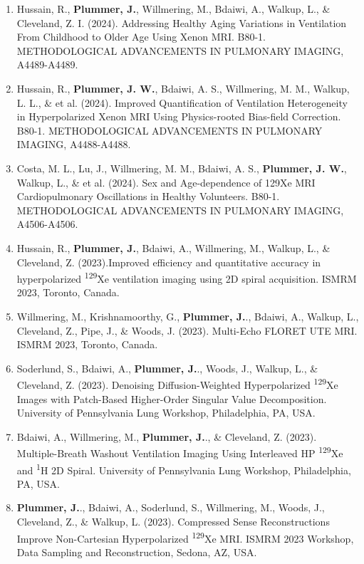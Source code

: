 \documentclass[12pt,]{scrartcl}
\begin{document}
\begin{enumerate}
    \item Hussain, R., \textbf{Plummer, J.}, Willmering, M., Bdaiwi, A., Walkup, L., \& Cleveland, Z. I. (2024). Addressing Healthy Aging Variations in Ventilation From Childhood to Older Age Using Xenon MRI. B80-1. METHODOLOGICAL ADVANCEMENTS IN PULMONARY IMAGING, A4489-A4489.

    \item Hussain, R., \textbf{Plummer, J. W.}, Bdaiwi, A. S., Willmering, M. M., Walkup, L. L., \& et al. (2024). Improved Quantification of Ventilation Heterogeneity in Hyperpolarized Xenon MRI Using Physics-rooted Bias-field Correction. B80-1. METHODOLOGICAL ADVANCEMENTS IN PULMONARY IMAGING, A4488-A4488.

    \item Costa, M. L., Lu, J., Willmering, M. M., Bdaiwi, A. S., \textbf{Plummer, J. W.}, Walkup, L., \& et al. (2024). Sex and Age-dependence of 129Xe MRI Cardiopulmonary Oscillations in Healthy Volunteers. B80-1. METHODOLOGICAL ADVANCEMENTS IN PULMONARY IMAGING, A4506-A4506.

    \item Hussain, R., \textbf{Plummer, J.}, Bdaiwi, A., Willmering, M., Walkup, L., \& Cleveland, Z. (2023).Improved efficiency and quantitative accuracy in hyperpolarized \textsuperscript{129}Xe ventilation imaging using 2D spiral acquisition. ISMRM 2023, Toronto, Canada.
    
  \item Willmering, M., Krishnamoorthy, G., \textbf{Plummer, J.}., Bdaiwi, A., Walkup, L., Cleveland, Z., Pipe, J., \& Woods, J. (2023). Multi-Echo FLORET UTE MRI. ISMRM 2023, Toronto, Canada.

  \item Soderlund, S., Bdaiwi, A., \textbf{Plummer, J.}., Woods, J., Walkup, L., \& Cleveland, Z. (2023). Denoising Diffusion-Weighted Hyperpolarized \textsuperscript{129}Xe Images with Patch-Based Higher-Order Singular Value Decomposition. University of Pennsylvania Lung Workshop, Philadelphia, PA, USA.
  
  \item Bdaiwi, A., Willmering, M., \textbf{Plummer, J.}., \& Cleveland, Z. (2023). Multiple-Breath Washout Ventilation Imaging Using Interleaved HP \textsuperscript{129}Xe and \textsuperscript{1}H 2D Spiral. University of Pennsylvania Lung Workshop, Philadelphia, PA, USA.
  
  \item \textbf{Plummer, J.}., Bdaiwi, A., Soderlund, S., Willmering, M., Woods, J., Cleveland, Z., \& Walkup, L. (2023). Compressed Sense Reconstructions Improve Non-Cartesian Hyperpolarized \textsuperscript{129}Xe MRI. ISMRM 2023 Workshop, Data Sampling and Reconstruction, Sedona, AZ, USA.  
  

\end{enumerate}
\end{document}
